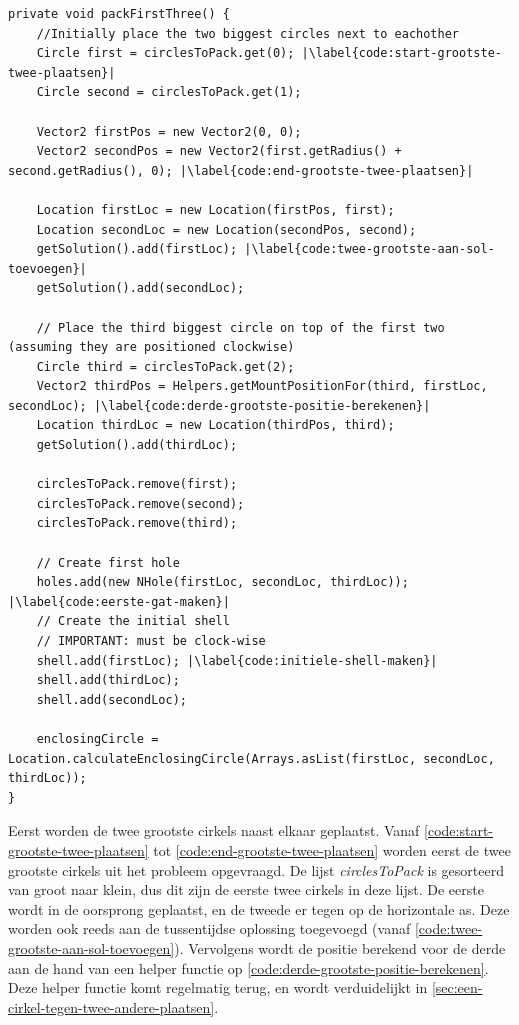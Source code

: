 \documentclass[12pt,a4paper,oneside]{book}
\begin{document}
\begin{lstlisting}
private void packFirstThree() {
	//Initially place the two biggest circles next to eachother
	Circle first = circlesToPack.get(0); |\label{code:start-grootste-twee-plaatsen}|
	Circle second = circlesToPack.get(1);

	Vector2 firstPos = new Vector2(0, 0);
	Vector2 secondPos = new Vector2(first.getRadius() + second.getRadius(), 0); |\label{code:end-grootste-twee-plaatsen}|

	Location firstLoc = new Location(firstPos, first);
	Location secondLoc = new Location(secondPos, second);
	getSolution().add(firstLoc); |\label{code:twee-grootste-aan-sol-toevoegen}|
	getSolution().add(secondLoc);

	// Place the third biggest circle on top of the first two (assuming they are positioned clockwise)
	Circle third = circlesToPack.get(2);
	Vector2 thirdPos = Helpers.getMountPositionFor(third, firstLoc, secondLoc); |\label{code:derde-grootste-positie-berekenen}|
	Location thirdLoc = new Location(thirdPos, third);
	getSolution().add(thirdLoc);

	circlesToPack.remove(first);
	circlesToPack.remove(second);
	circlesToPack.remove(third);

	// Create first hole
	holes.add(new NHole(firstLoc, secondLoc, thirdLoc)); |\label{code:eerste-gat-maken}|
	// Create the initial shell
	// IMPORTANT: must be clock-wise
	shell.add(firstLoc); |\label{code:initiele-shell-maken}|
	shell.add(thirdLoc);
	shell.add(secondLoc);

	enclosingCircle = Location.calculateEnclosingCircle(Arrays.asList(firstLoc, secondLoc, thirdLoc));
}
\end{lstlisting}

Eerst worden de twee grootste cirkels naast elkaar geplaatst.
Vanaf \autoref{code:start-grootste-twee-plaatsen} tot \autoref{code:end-grootste-twee-plaatsen} worden eerst de twee grootste cirkels uit het probleem opgevraagd.
De lijst \textit{circlesToPack} is gesorteerd van groot naar klein, dus dit zijn de eerste twee cirkels in deze lijst.
De eerste wordt in de oorsprong geplaatst, en de tweede er tegen op de horizontale as.
Deze worden ook reeds aan de tussentijdse oplossing toegevoegd (vanaf \autoref{code:twee-grootste-aan-sol-toevoegen}).
Vervolgens wordt de positie berekend voor de derde aan de hand van een helper functie op \autoref{code:derde-grootste-positie-berekenen}.
Deze helper functie komt regelmatig terug, en wordt verduidelijkt in \autoref{sec:een-cirkel-tegen-twee-andere-plaatsen}.
\end{document}
